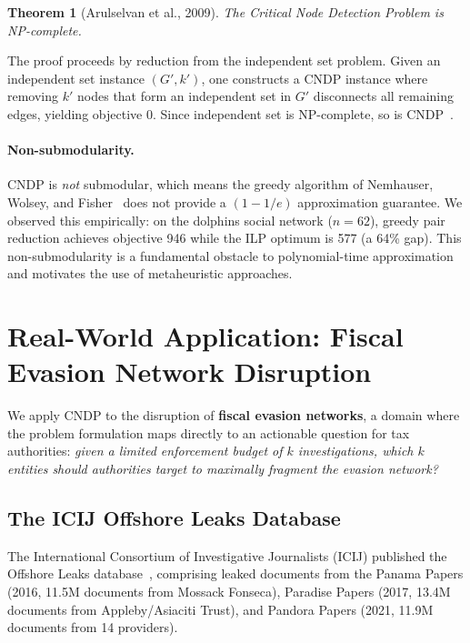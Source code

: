 \documentclass[11pt,a4paper]{article}
\newtheorem{theorem}{Theorem}
\begin{document}
\begin{theorem}[Arulselvan et al., 2009]
The Critical Node Detection Problem is NP-complete.
\end{theorem}

The proof proceeds by reduction from the independent set problem. Given an independent set instance $(G', k')$, one constructs a CNDP instance where removing $k'$ nodes that form an independent set in $G'$ disconnects all remaining edges, yielding objective 0. Since independent set is NP-complete, so is CNDP~\cite{arulselvan2009}.

\paragraph{Non-submodularity.} CNDP is \emph{not} submodular, which means the greedy algorithm of Nemhauser, Wolsey, and Fisher~\cite{nemhauser1978} does not provide a $(1 - 1/e)$ approximation guarantee. We observed this empirically: on the dolphins social network ($n=62$), greedy pair reduction achieves objective 946 while the ILP optimum is 577 (a 64\% gap). This non-submodularity is a fundamental obstacle to polynomial-time approximation and motivates the use of metaheuristic approaches.

\section{Real-World Application: Fiscal Evasion Network Disruption}
\label{sec:application}

We apply CNDP to the disruption of \textbf{fiscal evasion networks}, a domain where the problem formulation maps directly to an actionable question for tax authorities: \emph{given a limited enforcement budget of $k$ investigations, which $k$ entities should authorities target to maximally fragment the evasion network?}

\subsection{The ICIJ Offshore Leaks Database}

The International Consortium of Investigative Journalists (ICIJ) published the Offshore Leaks database~\cite{icij2021}, comprising leaked documents from the Panama Papers (2016, 11.5M documents from Mossack Fonseca), Paradise Papers (2017, 13.4M documents from Appleby/Asiaciti Trust), and Pandora Papers (2021, 11.9M documents from 14 providers).
\end{document}
